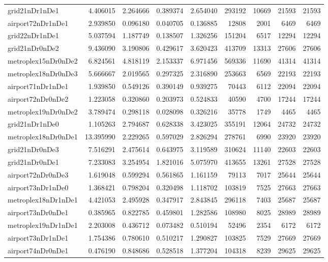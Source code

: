 \begin{longtable}{|l|r|r|r|r|r|r|r|r|}
grid21nDr1nDe1 & 4.406015 & 2.264666 & 0.389374 & 2.654040 & 293192 & 10669 & 21593 & 21593 \\
airport72nDr1nDe1 & 2.939850 & 0.096180 & 0.040705 & 0.136885 & 12808 & 2001 & 6469 & 6469 \\
grid22nDr1nDe1 & 5.037594 & 1.187749 & 0.138507 & 1.326256 & 151204 & 6517 & 12294 & 12294 \\
grid21nDr0nDe2 & 9.436090 & 3.190806 & 0.429617 & 3.620423 & 413709 & 13313 & 27606 & 27606 \\
metroplex15nDr0nDe2 & 6.824561 & 4.818119 & 2.153337 & 6.971456 & 569336 & 11690 & 41314 & 41314 \\
metroplex18nDr0nDe3 & 5.666667 & 2.019565 & 0.297325 & 2.316890 & 253663 & 6569 & 22193 & 22193 \\
airport71nDr1nDe1 & 1.939850 & 0.549126 & 0.390149 & 0.939275 & 70443 & 6112 & 22094 & 22094 \\
airport72nDr0nDe2 & 1.223058 & 0.320860 & 0.203973 & 0.524833 & 40590 & 4700 & 17244 & 17244 \\
metroplex19nDr0nDe2 & 3.789474 & 0.298118 & 0.028098 & 0.326216 & 35778 & 1749 & 4465 & 4465 \\
grid21nDr1nDe0 & 1.105263 & 2.794687 & 0.628338 & 3.423025 & 355191 & 12064 & 24732 & 24732 \\
metroplex18nDr0nDe1 & 13.395990 & 2.229265 & 0.597029 & 2.826294 & 278761 & 6990 & 23920 & 23920 \\
grid21nDr0nDe3 & 7.516291 & 2.475614 & 0.643975 & 3.119589 & 310624 & 11140 & 22603 & 22603 \\
grid21nDr0nDe1 & 7.233083 & 3.254954 & 1.821016 & 5.075970 & 413655 & 13261 & 27528 & 27528 \\
airport72nDr0nDe3 & 1.619048 & 0.599294 & 0.561865 & 1.161159 & 79113 & 7017 & 25644 & 25644 \\
airport73nDr1nDe0 & 1.368421 & 0.798204 & 0.320498 & 1.118702 & 103819 & 7525 & 27663 & 27663 \\
metroplex18nDr1nDe1 & 4.421053 & 2.495928 & 0.347917 & 2.843845 & 296118 & 7403 & 25687 & 25687 \\
airport73nDr0nDe1 & 0.385965 & 0.822785 & 0.459801 & 1.282586 & 108980 & 8025 & 28989 & 28989 \\
metroplex19nDr1nDe1 & 2.203008 & 0.436712 & 0.073482 & 0.510194 & 52496 & 2354 & 6172 & 6172 \\
airport73nDr1nDe1 & 1.754386 & 0.780610 & 0.510217 & 1.290827 & 103825 & 7529 & 27669 & 27669 \\
airport74nDr0nDe1 & 0.476190 & 0.848686 & 0.528518 & 1.377204 & 104318 & 8239 & 29625 & 29625 \\

\end{longtable}
